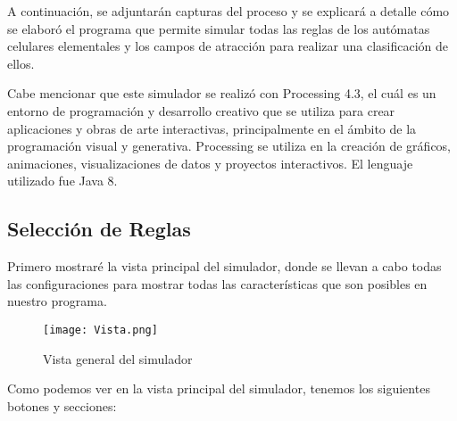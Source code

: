 \documentclass{article}
\begin{document}
	A continuación, se adjuntarán capturas del proceso y se explicará a detalle cómo se elaboró el programa que permite simular todas las reglas de los autómatas celulares elementales y los campos de atracción para realizar una clasificación de ellos. 
	
	Cabe mencionar que este simulador se realizó con Processing 4.3, el cuál es un entorno de programación y desarrollo creativo que se utiliza para crear aplicaciones y obras de arte interactivas, principalmente en el ámbito de la programación visual y generativa. Processing se utiliza en la creación de gráficos, animaciones, visualizaciones de datos y proyectos interactivos. El lenguaje utilizado fue Java 8. 
	
	\subsection{Selección de Reglas}
	
	Primero mostraré la vista principal del simulador, donde se llevan a cabo todas las configuraciones para mostrar todas las características que son posibles en nuestro programa.
	
	\begin{figure}[h]
		\centering       
		\texttt{[image: Vista.png]}
		\caption{Vista general del simulador}
		\label{fig:mi_imagen} 
	\end{figure}
	
	Como podemos ver en la vista principal del simulador, tenemos los siguientes botones y secciones:\\
\end{document}
